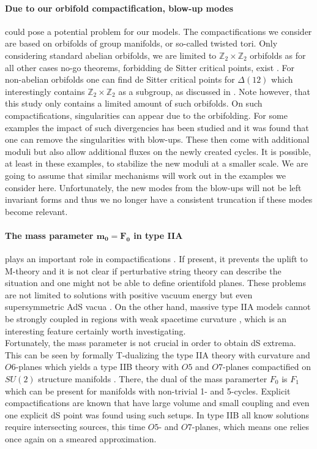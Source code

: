 \documentclass[a4paper,12pt]{report}
\begin{document}
\paragraph{Due to our orbifold compactification, blow-up modes} could pose a potential problem for our models. The compactifications we consider are based on orbifolds of group manifolds, or so-called twisted tori. Only considering standard abelian orbifolds, we are limited to $\mathbb{Z}_2 \times \mathbb{Z}_2$ orbifolds as for all other cases no-go theorems, forbidding de Sitter critical points, exist \cite{Flauger:2008ad}. For non-abelian orbifolds one can find de Sitter critical points for $\Delta(12)$ which interestingly contains $\mathbb{Z}_2 \times \mathbb{Z}_2$ as a subgroup, as discussed in \cite{Danielsson:2011au}. Note however, that this study only contains a limited amount of such orbifolds. On such compactifications, singularities can appear due to the orbifolding. For some examples the impact of such divergencies has been studied \cite{DeWolfe:2005uu,Ihl:2006pp} and it was found that one can remove the singularities with blow-ups. These then come with additional moduli but also allow additional fluxes on the newly created cycles. It is possible, at least in these examples, to stabilize the new moduli at a smaller scale. We are going to assume that similar mechanisms will work out in the examples we consider here. Unfortunately, the new modes from the blow-ups will not be left invariant forms and thus we no longer have a consistent truncation if these modes become relevant.
\paragraph{The mass parameter $\mathbf{m_0 = F_0}$ in type IIA} plays an important role in compactifications \cite{Romans:1985tz}. If present, it prevents the uplift to M-theory and it is not clear if perturbative string theory can describe the situation and one might not be able to define orientifold planes. These problems are not limited to solutions with positive vacuum energy but even supersymmetric AdS vacua \cite{Banks:2006hg}. On the other hand, massive type IIA models cannot be strongly coupled in regions with weak spacetime curvature \cite{Aharony:2010af}, which is an interesting feature certainly worth investigating.\\
Fortunately, the mass parameter is not crucial in order to obtain dS extrema. This can be seen by formally T-dualizing the type IIA theory with curvature and $O6$-planes which yields a type IIB theory with $O5$ and $O7$-planes compactified on $SU(2)$ structure manifolds \cite{Caviezel:2009tu}. There, the dual of the mass paramerter $F_0$ is $F_1$ which can be present for manifolds with non-trivial 1- and 5-cycles. Explicit compactifications are known that have large volume and small coupling and even one explicit dS point was found using such setups. In type IIB all know solutions require intersecting sources, this time $O5$- and $O7$-planes, which means one relies once again on a smeared approximation.
\end{document}
